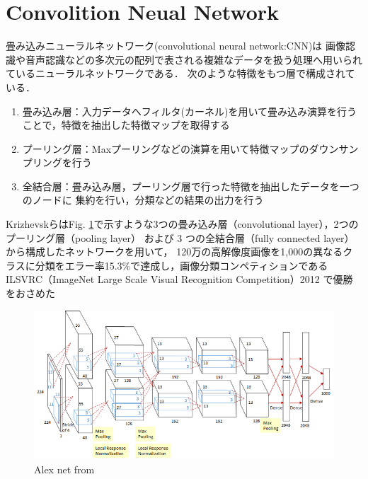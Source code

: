 \newpage
\section{Convolition Neual Network}
畳み込みニューラルネットワーク(convolutional neural network:CNN)は
画像認識や音声認識などの多次元の配列で表される複雑なデータを扱う処理へ用いられているニューラルネットワークである．
次のような特徴をもつ層で構成されている．

\begin{enumerate}
    \item 畳み込み層：入力データへフィルタ(カーネル)を用いて畳み込み演算を行うことで，特徴を抽出した特徴マップを取得する
    \item プーリング層：Maxプーリングなどの演算を用いて特徴マップのダウンサンプリングを行う
    \item 全結合層：畳み込み層，プーリング層で行った特徴を抽出したデータを一つのノードに
                      集約を行い，分類などの結果の出力を行う
\end{enumerate}


Krizhevskら\cite{Imagenet}はFig. \ref{fig::alex}で示すような3つの畳み込み層（convolutional layer），2つのプーリング層（pooling layer）
および 3 つの全結合層（fully connected layer）から構成したネットワークを用いて，
120万の高解像度画像を1,000の異なるクラスに分類をエラー率15.3\%で達成し，画像分類コンペティションであるILSVRC（ImageNet Large Scale Visual Recognition Competition）2012
で優勝をおさめた

\vspace{2.0zh}

\begin{figure}[h]
    \centering
    \includegraphics[width = 11.5cm]{./figs/alex.pdf}
    \caption{Alex net from \cite{Imagenet}}
    \label{fig::alex}
\end{figure}

\newpage
